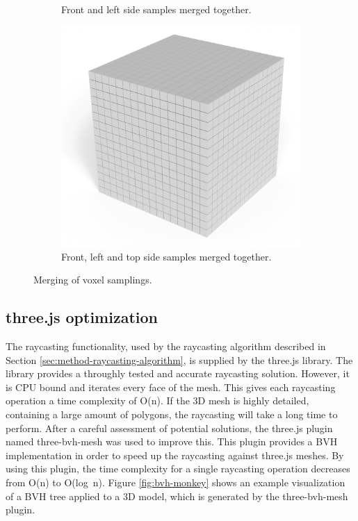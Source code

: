 \begin{figure}[h]
\begin{subfigure}[t]{0.3\textwidth}
        \caption{Front and left side samples merged together.}
        \label{fig:filling-watertight-model}
    \end{subfigure}
    \hfill
    \begin{subfigure}[t]{0.3\textwidth}
        \centering
        \includegraphics[width=\textwidth]{sections/methodology/figures/voxels-merge-3.png}
        \caption{Front, left and top side samples merged together.}
        \label{fig:filling-watertight-model}
    \end{subfigure}
       \caption{Merging of voxel samplings.}
       \label{fig:voxel-sample-merging}
\end{figure}

\subsection{three.js optimization}
The raycasting functionality, used by the raycasting algorithm described in Section \ref{sec:method-raycasting-algorithm}, is supplied by the three.js library. The library provides a throughly tested and accurate raycasting solution. However, it is CPU bound and  iterates every face of the mesh. This gives each raycasting operation a time complexity of O(n). If the 3D mesh is highly detailed, containing a large amount of polygons, the raycasting will take a long time to perform. After a careful assessment of potential solutions, the three.js plugin named three-bvh-mesh \cite{three-bvh-mesh} was used to improve this. This plugin provides a BVH implementation in order to speed up the raycasting against three.js meshes. By using this plugin, the time complexity for a single raycasting operation decreases from O(n) to O(log~n). Figure \ref{fig:bvh-monkey} shows an example visualization of a BVH tree applied to a 3D model, which is generated by the three-bvh-mesh plugin.

